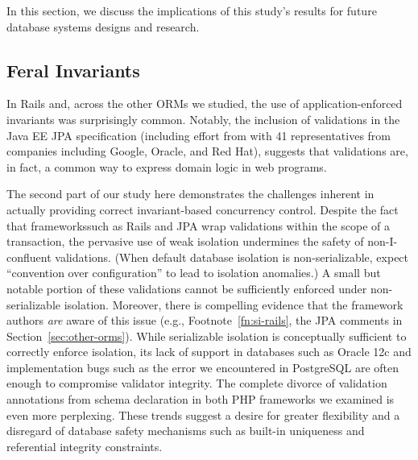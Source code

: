 In this section, we discuss the implications of this study's results
for future database systems designs and research.

\subsection{Feral Invariants}

In Rails and, across the other ORMs we studied, the use of
application-enforced invariants was surprisingly common. Notably, the
inclusion of validations in the Java EE JPA specification (including
effort from with 41 representatives from companies including Google,
Oracle, and Red Hat), suggests that validations are, in fact, a common
way to express domain logic in web programs.

The second part of our study here demonstrates the challenges inherent
in actually providing correct invariant-based concurrency
control. Despite the fact that frameworkssuch as Rails and JPA wrap
validations within the scope of a transaction, the pervasive use of
weak isolation undermines the safety of non-I-confluent
validations. (When default database isolation is non-serializable,
expect ``convention over configuration'' to lead to isolation
anomalies.) A small but notable portion of these validations cannot be
sufficiently enforced under non-serializable isolation. Moreover,
there is compelling evidence that the framework authors \textit{are}
aware of this issue (e.g., Footnote~\ref{fn:si-rails}, the JPA
comments in Section~\ref{sec:other-orms}). While serializable
isolation is conceptually sufficient to correctly enforce isolation,
its lack of support in databases such as Oracle 12c and implementation
bugs such as the error we encountered in PostgreSQL are often enough
to compromise validator integrity. The complete divorce of validation
annotations from schema declaration in both PHP frameworks we examined
is even more perplexing. These trends suggest a desire for greater
flexibility and a disregard of database safety mechanisms such as
built-in uniqueness and referential integrity constraints.

